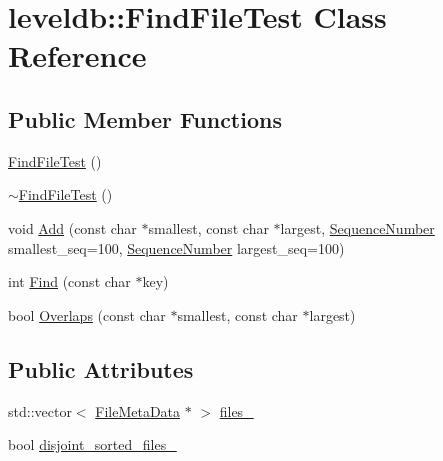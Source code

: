 \hypertarget{classleveldb_1_1_find_file_test}{\section{leveldb\-:\-:Find\-File\-Test Class Reference}
\label{classleveldb_1_1_find_file_test}
}
\subsection*{Public Member Functions}
\begin{DoxyCompactItemize}
\item 
\hyperlink{classleveldb_1_1_find_file_test_a79d3a7171588c32598d46610563709e8}{Find\-File\-Test} ()
\item 
\hyperlink{classleveldb_1_1_find_file_test_a147a326f046217d4a6cf737d3346bde7}{$\sim$\-Find\-File\-Test} ()
\item 
void \hyperlink{classleveldb_1_1_find_file_test_a7daf932b5d9881438c6edb5f7881901c}{Add} (const char $\ast$smallest, const char $\ast$largest, \hyperlink{namespaceleveldb_a5481ededd221c36d652c371249f869fa}{Sequence\-Number} smallest\-\_\-seq=100, \hyperlink{namespaceleveldb_a5481ededd221c36d652c371249f869fa}{Sequence\-Number} largest\-\_\-seq=100)
\item 
int \hyperlink{classleveldb_1_1_find_file_test_a233fd8c1e1764f2572e03d28b1f58ae0}{Find} (const char $\ast$key)
\item 
bool \hyperlink{classleveldb_1_1_find_file_test_a617e51dc2e6acbe7d5bc6d0a7224ac51}{Overlaps} (const char $\ast$smallest, const char $\ast$largest)
\end{DoxyCompactItemize}
\subsection*{Public Attributes}
\begin{DoxyCompactItemize}
\item 
std\-::vector$<$ \hyperlink{structleveldb_1_1_file_meta_data}{File\-Meta\-Data} $\ast$ $>$ \hyperlink{classleveldb_1_1_find_file_test_a53b61e6b01283c235fae219013b0e2c7}{files\-\_\-}
\item 
bool \hyperlink{classleveldb_1_1_find_file_test_acf50512be17b9a3cd96388a8c837b8e0}{disjoint\-\_\-sorted\-\_\-files\-\_\-}
\end{DoxyCompactItemize}


